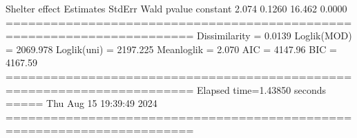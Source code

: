 \documentclass[letterpaper,10pt,english]{sphinxmanual}
\begin{document}
\begin{sphinxVerbatim}[commandchars=\\\{\}]
Shelter effect
          Estimates  StdErr     Wald  p\PYGZhy{}value
constant     \PYGZhy{}2.074  0.1260  \PYGZhy{}16.462   0.0000
=======================================================================
Dissimilarity = 0.0139
Loglik(MOD)   = \PYGZhy{}2069.978
Loglik(uni)   = \PYGZhy{}2197.225
Mean\PYGZhy{}loglik   = \PYGZhy{}2.070
\PYGZhy{}\PYGZhy{}\PYGZhy{}\PYGZhy{}\PYGZhy{}\PYGZhy{}\PYGZhy{}\PYGZhy{}\PYGZhy{}\PYGZhy{}\PYGZhy{}\PYGZhy{}\PYGZhy{}\PYGZhy{}\PYGZhy{}\PYGZhy{}\PYGZhy{}\PYGZhy{}\PYGZhy{}\PYGZhy{}\PYGZhy{}\PYGZhy{}\PYGZhy{}\PYGZhy{}\PYGZhy{}\PYGZhy{}\PYGZhy{}\PYGZhy{}\PYGZhy{}\PYGZhy{}\PYGZhy{}\PYGZhy{}\PYGZhy{}\PYGZhy{}\PYGZhy{}\PYGZhy{}\PYGZhy{}\PYGZhy{}\PYGZhy{}\PYGZhy{}\PYGZhy{}\PYGZhy{}\PYGZhy{}\PYGZhy{}\PYGZhy{}\PYGZhy{}\PYGZhy{}\PYGZhy{}\PYGZhy{}\PYGZhy{}\PYGZhy{}\PYGZhy{}\PYGZhy{}\PYGZhy{}\PYGZhy{}\PYGZhy{}\PYGZhy{}\PYGZhy{}\PYGZhy{}\PYGZhy{}\PYGZhy{}\PYGZhy{}\PYGZhy{}\PYGZhy{}\PYGZhy{}\PYGZhy{}\PYGZhy{}\PYGZhy{}\PYGZhy{}\PYGZhy{}\PYGZhy{}
AIC = 4147.96
BIC = 4167.59
=======================================================================
Elapsed time=1.43850 seconds =====\PYGZgt{}\PYGZgt{}\PYGZgt{} Thu Aug 15 19:39:49 2024
=======================================================================
\end{sphinxVerbatim}

\noindent{}
\end{document}
